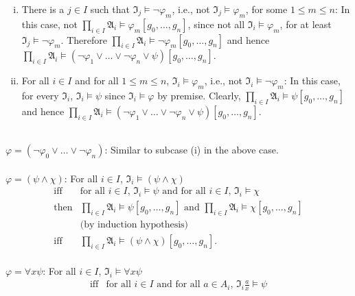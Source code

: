 \begin{enumerate}[1.]
\begin{enumerate}[(i)]
\item There is a $j \in I$ such that $\mathfrak{I}_j \models \neg \varphi_m$, i.e., not $\mathfrak{I}_j \models \varphi_m$, for some $1 \leq m \leq n$: In this case, not $\prod_{i \in I} \mathfrak{A}_i \models \varphi_m [g_0, \ldots , g_n]$, since not all $\mathfrak{I}_i \models \varphi_m$, for at least $\mathfrak{I}_j \models \neg \varphi_m$. Therefore $\prod_{i \in I} \mathfrak{A}_i \models \neg \varphi_m [g_0, \ldots , g_n]$ and hence $\prod_{i \in I} \mathfrak{A}_i \models (\neg \varphi_1 \lor \ldots \lor \neg \varphi_n \lor \psi) [g_0, \ldots , g_n]$.\\
\item For all $i \in I$ and for all $1 \leq m \leq n$, $\mathfrak{I}_i \models \varphi_m$, i.e., not $\mathfrak{I}_i \models \neg \varphi_m$: In this case, for every $\mathfrak{I}_i$, $\mathfrak{I}_i \models \psi$ since $\mathfrak{I}_i \models \varphi$ by premise. Clearly, $\prod_{i \in I} \mathfrak{A}_i \models \psi [g_0, \ldots , g_n]$ and hence $\prod_{i \in I} \mathfrak{A}_i \models (\neg \varphi_1 \lor \ldots \lor \neg \varphi_n \lor \psi) [g_0, \ldots , g_n]$.\\
\end{enumerate}
\ 
\\$\varphi = (\neg \varphi_0 \lor \ldots \lor \neg \varphi_n)$: Similar to subcase (i) in the above case.\\
\ 
\\$\varphi = (\psi \land \chi)$: For all $i \in I$, $\mathfrak{I}_i \models (\psi \land \chi)$
\[
\begin{array}{ll}
\mbox{iff} & \mbox{for all $i \in I$, $\mathfrak{I}_i \models \psi$ and for all $i \in I$, $\mathfrak{I}_i \models \chi$} \\
\mbox{then} & \mbox{$\prod_{i \in I} \mathfrak{A}_i \models \psi [g_0, \ldots , g_n]$ and $\prod_{i \in I} \mathfrak{A}_i \models \chi [g_0, \ldots , g_n]$} \\
\,  & \mbox{(by induction hypothesis)} \\
\mbox{iff} & \prod_{i \in I} \mathfrak{A}_i \models (\psi \land \chi) [g_0, \ldots , g_n].
\end{array}
\]
\ 
\\$\varphi = \forall x \psi$: For all $i \in I$, $\mathfrak{I}_i \models \forall x \psi$
\[
\begin{array}{ll}
\mbox{iff} & \mbox{for all $i \in I$ and for all $a \in A_i$, $\mathfrak{I}_i \frac{a}{x} \models \psi$} \\

\end{array}\]
\end{enumerate}
